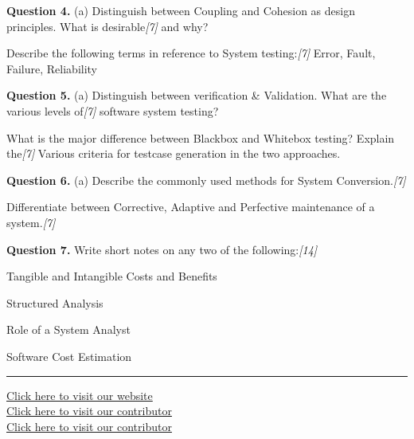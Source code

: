 \documentclass[11pt,a4paper]{article}
\newcommand{\pts}[1]{\hfill   \textit{[#1]}}
\begin{document}
\medskip


\noindent   \textbf{Question 4.} (a) Distinguish between Coupling and Cohesion as design principles. What is desirable\pts{7}
and why?

\begin{parts}
  \item Describe the following terms in reference to System testing:\pts{7}
  Error, Fault, Failure, Reliability
\end{parts}

\medskip


\noindent   \textbf{Question 5.} (a) Distinguish between verification \& Validation. What are the various levels of\pts{7}
software system testing?

\begin{parts}
  \item What is the major difference between Blackbox and Whitebox testing? Explain the\pts{7}
  Various criteria for testcase generation in the two approaches.
\end{parts}

\medskip


\noindent   \textbf{Question 6.} (a) Describe the commonly used methods for System Conversion.\pts{7}

\begin{parts}
  \item Differentiate between Corrective, Adaptive and Perfective maintenance of a system.\pts{7}
\end{parts}

\medskip


\noindent   \textbf{Question 7.} Write short notes on any two of the following:\pts{14}

\begin{parts}
  \item Tangible and Intangible Costs and Benefits
  \item Structured Analysis
  \item Role of a System Analyst
  \item Software Cost Estimation
\end{parts}

\vfill
\rule{\linewidth}{0.4pt}

\begin{center}\small
\href{https://bhu-exam.vercel.app/}{Click here to visit our website}\\[4pt]\href{https://me-aryan.vercel.app/}{Click here to visit our contributor}\\[4pt]\href{https://quashan-me.vercel.app/}{Click here to visit our contributor}
\end{center}
\end{document}
